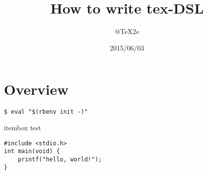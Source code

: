 \documentclass[a4j,titlepage]{jarticle}
\title{How to write tex-DSL}
\author{@TeX2e}
\date{2015/06/03}
\begin{document}
\maketitle{}
\thispagestyle{empty}
\newpage{}

\section{Overview}
\begin{screen}
\begin{verbatim}
$ eval "$(rbenv init -)"
\end{verbatim}
\end{screen}
\begin{itembox}{itembox test}
\begin{verbatim}
#include <stdio.h>
int main(void) {
	printf("hello, world!");
}
\end{verbatim}
\end{itembox}
\end{document}
